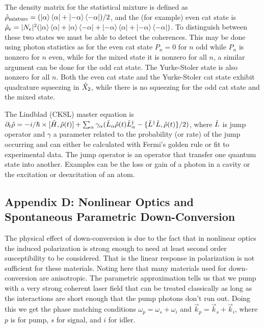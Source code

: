The density matrix for the statistical mixture is defined as $\hat{\rho}_\text{mixture} = (\ket{\alpha}\bra{\alpha} + \ket{-\alpha}\bra{-\alpha})/2$, and the (for example) even cat state is $\hat{\rho}_e = |N_e|^2 (\ket{\alpha}\bra{\alpha} + \ket{\alpha}\bra{-\alpha} + \ket{-\alpha}\bra{\alpha} + \ket{-\alpha}\bra{-\alpha})$. To distinguish between these two states we must be able to detect the coherences. This may be done using photon statistics as for the even cat state $P_n = 0$ for $n$ odd while $P_n$ is nonzero for $n$ even, while for the mixed state it is nonzero for all $n$, a similar argument can be done for the odd cat state. The Yurke-Stoler state is also nonzero for all $n$. Both the even cat state and the Yurke-Stoler cat state exhibit quadrature squeezing in $\hat{X}_2$, while there is no squeezing for the odd cat state and the mixed state. 

The Lindblad (CKSL) master equation is $\partial_t \hat{\rho} = -i /\hbar \times [\hat{H}, \hat{\rho}(t)]  + \sum_\alpha \gamma_\alpha (\hat{L}_\alpha \hat{\rho}(t) \hat{L}^\dagger_\alpha - \{ \hat{L}^\dagger\hat{L}, \hat{\rho}(t) \}/2)$, where $\hat{L}$ is jump operator and $\gamma$ a parameter related to the probability (or rate) of the jump occurring and can either be calculated with Fermi's golden rule or fit to experimental data. The jump operator is an operator that transfer one quantum state into another. Examples can be the loss or gain of a photon in a cavity or the excitation or deexcitation of an atom. 

\subsection*{Appendix D: Nonlinear Optics and Spontaneous Parametric Down-Conversion}
The physical effect of down-conversion is due to the fact that in nonlinear optics the induced polarization is strong enough to need at least second order susceptibility to be considered. That is the linear response in polarization is not sufficient for these materials. Noting here that many materials used for down-conversion are anisotropic.  The parametric approximation tells us that we pump with a very strong coherent laser field that can be treated classically as long as the interactions are short enough that the pump photons don't run out. Doing this we get the phase matching conditions $\omega_p = \omega_s + \omega_i$ and $\vec{k}_p = \vec{k}_s + \vec{k}_i$, where $p$ is for pump, $s$ for signal, and $i$ for idler.